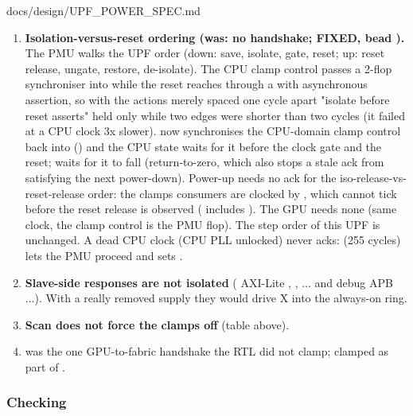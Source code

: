\begin{relocated}{docs/design/UPF_POWER_SPEC.md}
\begin{enumerate}
\def\labelenumi{\arabic{enumi}.}
\tightlist
\item
  \textbf{Isolation-versus-reset ordering (was: no handshake; FIXED,
  bead ).} The PMU walks the UPF order (down: save, isolate,
  gate, reset; up: reset release, ungate, restore, de-isolate). The CPU
  clamp control passes a 2-flop synchroniser into 
  while the reset reaches  through a 
  with asynchronous assertion, so with the actions merely spaced one
   cycle apart "isolate before reset asserts" held only
  while two  edges were shorter than two
   cycles (it failed at a CPU clock 3x slower).
   now synchronises the CPU-domain
  clamp control back into  () and
  the CPU  state waits for it before the clock gate and
  the reset;  waits for it to fall (return-to-zero,
  which also stops a stale ack from satisfying the next power-down).
  Power-up needs no ack for the iso-release-vs-reset-release order: the
  clamp\textquotesingle s consumers are clocked by ,
  which cannot tick before the reset release is observed
  ( includes ). The
  GPU needs none (same clock, the clamp control is the PMU flop). The
  step order of this UPF is unchanged. A dead CPU clock (CPU PLL
  unlocked) never acks:  (255 
  cycles) lets the PMU proceed and sets .
\item
  \textbf{Slave-side responses are not isolated} ( AXI-Lite
  , , ... and  debug APB
   ...). With a really removed supply they would drive X
  into the always-on ring.
\item
  \textbf{Scan does not force the clamps off} (table above).
\item
   was the one GPU-to-fabric handshake the RTL
  did not clamp; clamped as part of .
\end{enumerate}

\subsubsection{Checking}\label{ds:ch:upf-power-spec:checking}


\end{relocated}
